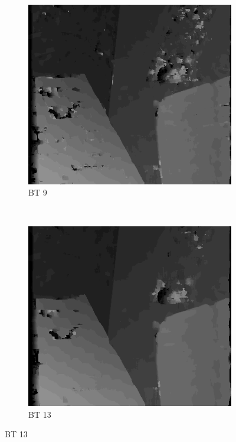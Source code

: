 \begin{figure}
  \begin{subfigure}[b]{0.23\textwidth}
    \centering
    \includegraphics[width=\textwidth]{images/stereo-pairs/venus_bt_9.png}
    \caption{BT 9}
  \end{subfigure}
  ~
  \begin{subfigure}[b]{0.23\textwidth}
    \centering
    \includegraphics[width=\textwidth]{images/stereo-pairs/venus_bt_13.png}
    \caption{BT 13}

\end{subfigure}
\end{figure}
